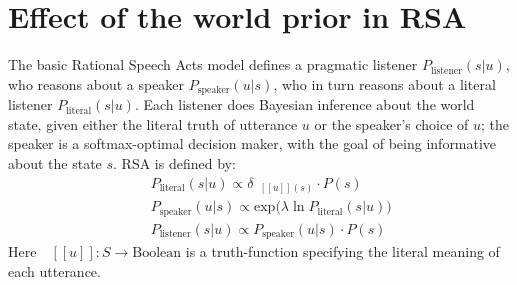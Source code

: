 \documentclass[10pt,letterpaper]{article}
\newcommand{\denote}[1]{\mbox{ $[\![ #1 ]\!]$}}
\begin{document}
%


\section{Effect of the world prior in RSA}

The basic Rational Speech Acts model defines a pragmatic listener $P_{\textrm{listener}}(s|u)$, who reasons about a speaker $P_{\textrm{speaker}}(u|s)$, who in turn reasons about a literal listener $P_{\textrm{literal}}(s|u)$. Each listener does Bayesian inference about the world state, given either the literal truth of utterance $u$ or the speaker's choice of $u$; the speaker is a softmax-optimal decision maker, with the goal of being informative about the state $s$.
RSA is defined by:
\begin{eqnarray}
&&P_{\textrm{literal}}(s|u)\propto \delta_{\denote{u}(s)} \cdot P(s)\\
&&P_{\textrm{speaker}}(u|s) \propto \mathrm{exp}({\lambda \ln P_{\textrm{literal}}(s|u))}\\ 
&&P_{\textrm{listener}}(s|u)\propto P_{\textrm{speaker}}(u|s)\cdot P(s)
\end{eqnarray}
Here $\denote{u}: S \rightarrow \text{Boolean}$ is a truth-function specifying the literal meaning of each utterance.
\end{document}
